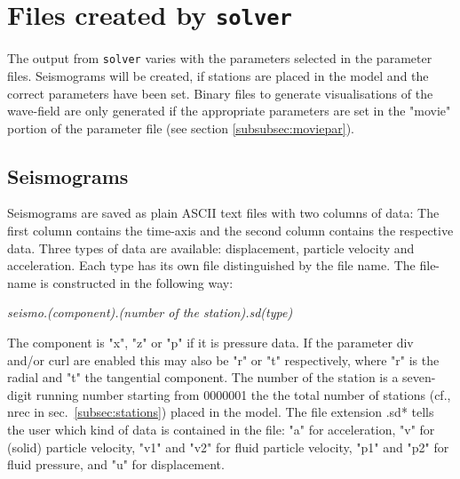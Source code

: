 	\section{Files created by \texttt{solver}}
	\label{sec:solver}
		The output from \texttt{solver} varies with the parameters selected in the parameter files. Seismograms will be created, if stations are placed in the model and the correct parameters have been set. Binary files to generate visualisations of the wave-field are only generated if the appropriate parameters are set in the "movie" portion of the parameter file (see section \ref{subsubsec:moviepar}).
		
		\subsection{Seismograms}
			Seismograms are saved as plain ASCII text files with two columns of data: The first column contains the time-axis and the second column contains the respective data. Three types of data are available: displacement, particle velocity and acceleration. Each type has its own file distinguished by the file name. The file-name is constructed in the following way:
			\begin{center}%
				\emph{seismo.(component).(number of the station).sd(type)}
			\end{center}
			The component is "x", "z" or "p" if it is pressure data. If the parameter div and/or curl are enabled this may also be "r" or "t" respectively, where "r" is the radial and "t" the tangential component. The number of the station is a seven-digit running number starting from 0000001 the the total number of stations (cf., nrec in sec.~\ref{subsec:stations}) placed in the model. The file extension .sd* tells the user which kind of data is contained in the file: "a" for acceleration, "v" for (solid) particle velocity, "v1" and "v2" for fluid particle velocity, "p1" and "p2" for fluid pressure, and "u" for displacement.\\
			
			
